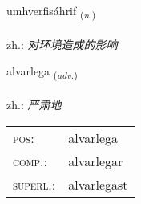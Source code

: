 \documentclass[frontgrid, backgrid]{flacards}\usepackage[]{graphicx}\usepackage[]{xcolor}
\begin{document}
\renewcommand{\blhead}{\vskip5pt {\small\bfseries\footnotesize Nafnorð | 名词 }}
\renewcommand{\bcfoot}{\vskip5pt \hspace{2pt}{\small\bfseries\footnotesize 3K}}


{umhverfisáhrif \small{\textsubscript{(\textit{n.})}} \\[1ex] %
\textphonetic{[ʏmkʰvɛrvɪsaur̥ɪv]} \\
zh.: \emph{对环境造成的影响} \\  [2ex]
\renewcommand*{\arraystretch}{0.8}
}

\renewcommand{\flhead}{\vskip5pt \fboxsep=0pt {\small\bfseries\footnotesize Atviksorð | 副词}}
\renewcommand{\fcfoot}{\vskip5pt \fboxsep=0pt \hspace{2pt}{\small\bfseries\footnotesize 3K}}

\renewcommand{\blhead}{\vskip5pt {\small\bfseries\footnotesize Atviksorð | 副词 }}
\renewcommand{\bcfoot}{\vskip5pt \hspace{2pt}{\small\bfseries\footnotesize 3K}}


{alvarlega \small{\textsubscript{(\textit{adv.})}} \\[1ex] %
\textphonetic{[alvarlɛɣa]} \\
zh.: \emph{严肃地} \\  [2ex]
\renewcommand*{\arraystretch}{0.8}
\begin{tabular}{ll}
\textsc{pos}: & alvarlega \\ 
\textsc{comp.}: & alvarlegar \\ 
\textsc{superl.}: & alvarlegast \\
\end{tabular}
}

\renewcommand{\flhead}{\vskip5pt \fboxsep=0pt {\small\bfseries\footnotesize Nafnorð | 名词}}
\renewcommand{\fcfoot}{\vskip5pt \fboxsep=0pt \hspace{2pt}{\small\bfseries\footnotesize 3K}}
\end{document}
